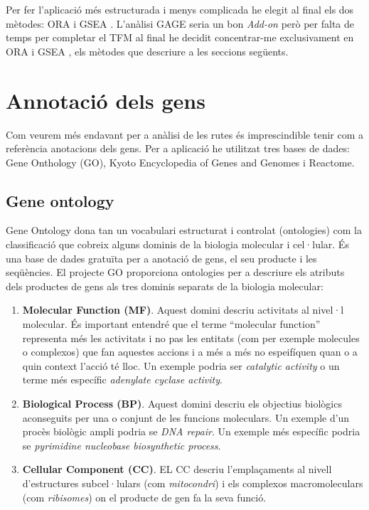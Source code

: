 Per fer l'aplicació més estructurada i menys complicada he elegit al final els dos mètodes: ORA \cite{boyle2004go} i GSEA \cite{subramanian2005gene}. L'anàlisi GAGE seria un bon \textit{Add-on} però per falta de temps per completar el TFM al final he decidit concentrar-me exclusivament en ORA i GSEA , els mètodes que descriure a les seccions següents.


\section{Annotació dels gens}

Com veurem més endavant per a anàlisi de les rutes és imprescindible tenir com a referència anotacions dels gens. Per a aplicació he utilitzat tres bases de dades: Gene Onthology (GO), Kyoto Encyclopedia of Genes and Genomes i Reactome. 

\subsection{Gene ontology}
Gene Ontology \cite{gene2004gene} dona tan un vocabulari estructurat i controlat (ontologies) com la classificació que cobreix alguns dominis de la biologia molecular i cel·lular. És una base de dades gratuïta per a anotació de gens, el seu producte i les seqüències. El projecte GO proporciona ontologies per a descriure els atributs dels productes de gens als tres dominis separats de la biologia molecular:
\begin{enumerate}
\item \textbf{Molecular Function (MF)}. Aquest domini descriu activitats al nivel·l molecular. És important entendré que el terme ``molecular function'' representa més les activitats i no pas les entitats (com per exemple molecules o complexos) que fan aquestes accions i a més a més no espeifíquen quan o a quin context l'acció té lloc. Un exemple podria ser \textit{catalytic activity} o un terme més específic \textit{adenylate cyclase activity}.
\item \textbf{Biological Process (BP)}. Aquest domini descriu els objectius biològics aconseguits per una o conjunt de les funcions moleculars. Un exemple d'un procès biològic ampli podria se \textit{DNA repair}. Un exemple més específic podria se \textit{pyrimidine nucleobase biosynthetic process}. 
\item \textbf{Cellular Component (CC)}. EL CC descriu l'emplaçaments al nivell d'estructures subcel·lulars (com \textit{mitocondri}) i els complexos macromoleculars (com \textit{ribisomes}) on el producte de gen fa la seva funció.
\end{enumerate}

